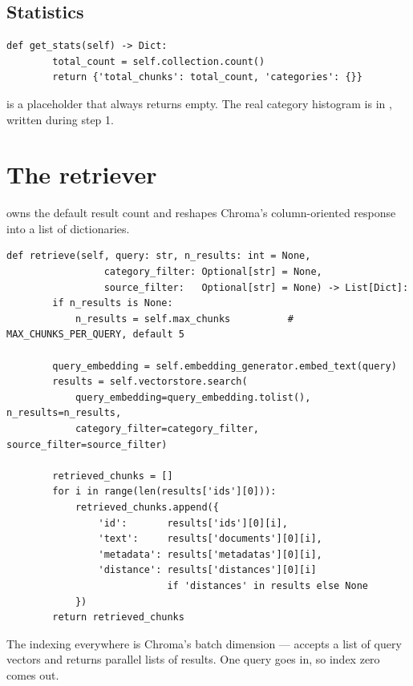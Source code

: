 \subsection{Statistics}

\begin{lstlisting}[style=py,firstnumber=51]
    def get_stats(self) -> Dict:
        total_count = self.collection.count()
        return {'total_chunks': total_count, 'categories': {}}
\end{lstlisting}

 is a placeholder that always returns empty. The real category histogram is in , written during step 1.

\section{The retriever}

 owns the default result count and reshapes Chroma's column-oriented response into a list of dictionaries.

\begin{lstlisting}[style=py,firstnumber=13]
    def retrieve(self, query: str, n_results: int = None,
                 category_filter: Optional[str] = None,
                 source_filter:   Optional[str] = None) -> List[Dict]:
        if n_results is None:
            n_results = self.max_chunks          # MAX_CHUNKS_PER_QUERY, default 5

        query_embedding = self.embedding_generator.embed_text(query)
        results = self.vectorstore.search(
            query_embedding=query_embedding.tolist(), n_results=n_results,
            category_filter=category_filter, source_filter=source_filter)

        retrieved_chunks = []
        for i in range(len(results['ids'][0])):
            retrieved_chunks.append({
                'id':       results['ids'][0][i],
                'text':     results['documents'][0][i],
                'metadata': results['metadatas'][0][i],
                'distance': results['distances'][0][i]
                            if 'distances' in results else None
            })
        return retrieved_chunks
\end{lstlisting}

The \code{[0]} indexing everywhere is Chroma's batch dimension ---  accepts a list of query vectors and returns parallel lists of results. One query goes in, so index zero comes out.

